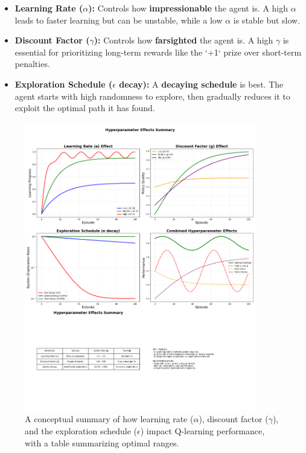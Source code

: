 \documentclass[11pt, a4paper]{article}
\begin{document}
\begin{itemize}
    \item \textbf{Learning Rate ($\alpha$):} Controls how \textbf{impressionable} the agent is. A high $\alpha$ leads to faster learning but can be unstable, while a low $\alpha$ is stable but slow.
    
    \item \textbf{Discount Factor ($\gamma$):} Controls how \textbf{farsighted} the agent is. A high $\gamma$ is essential for prioritizing long-term rewards like the `+1` prize over short-term penalties.
    
    \item \textbf{Exploration Schedule ($\epsilon$ decay):} A \textbf{decaying schedule} is best. The agent starts with high randomness to explore, then gradually reduces it to exploit the optimal path it has found.
\end{itemize}

\begin{figure}[H]
    \centering
    \includegraphics[width=0.9\textwidth]{images/hyperparameter_effects_summary.png}
    \caption{A conceptual summary of how learning rate ($\alpha$), discount factor ($\gamma$), and the exploration schedule ($\epsilon$) impact Q-learning performance, with a table summarizing optimal ranges.}\label{fig:hyperparameter_summary}
\end{figure}
\end{document}
